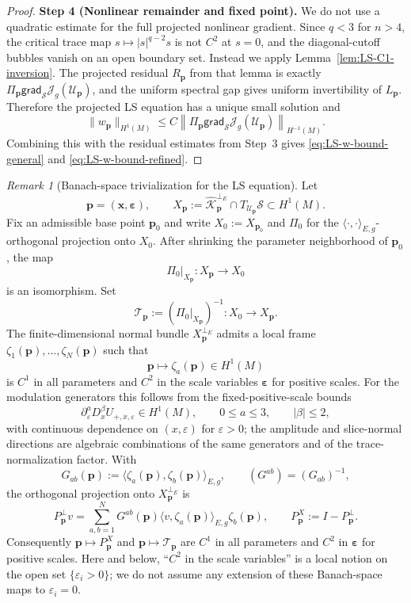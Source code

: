 \documentclass[11pt,reqno,a4paper]{amsart}
\numberwithin{equation}{section}
\theoremstyle{plain}
\theoremstyle{remark}
\newtheorem{remark}[theorem]{Remark}
\theoremstyle{plain}
\begin{document}
\begin{proof}
\medskip\noindent
\textbf{Step 4 (Nonlinear remainder and fixed point).}
We do not use a quadratic estimate for the full projected nonlinear gradient.
Since $q<3$ for $n>4$, the critical trace map $s\mapsto|s|^{q-2}s$ is not
$C^2$ at $s=0$, and the diagonal-cutoff bubbles vanish on an open boundary
set.  Instead we apply Lemma~\ref{lem:LS-C1-inversion}.  The projected
residual $R_{\mathbf p}$ from that lemma is exactly
$\Pi_{\mathbf p}\mathsf{grad}_{\mathcal S}\mathcal J_g(\mathcal U_{\mathbf p})$,
and the uniform spectral gap gives uniform invertibility of
$L_{\mathbf p}$.  Therefore the projected LS equation has a unique small
solution and
\[
\|w_{\mathbf p}\|_{H^1(M)}
\le
C
\left\|
\Pi_{\mathbf p}\mathsf{grad}_{\mathcal S}
\mathcal J_g(\mathcal U_{\mathbf p})
\right\|_{H^{-1}(M)}.
\]
Combining this with the residual estimates from Step~3 gives
\eqref{eq:LS-w-bound-general} and \eqref{eq:LS-w-bound-refined}.
\end{proof}

\begin{remark}[Banach-space trivialization for the LS equation]
\label{rem:banach-trivialization}
Let
\[
\mathbf p=(\mathbf x,\boldsymbol\varepsilon),\qquad
X_{\mathbf p}:=\widehat{\mathcal K}_{\mathbf p}^{\perp_E}
\cap T_{\mathcal U_{\mathbf p}}\mathcal S\subset H^1(M).
\]
Fix an admissible base point $\mathbf p_0$ and write $X_0:=X_{\mathbf p_0}$ and
$\Pi_0$ for the $\langle\cdot,\cdot\rangle_{E,g}$-orthogonal projection onto $X_0$.
After shrinking the parameter neighborhood of $\mathbf p_0$, the map
\[
\Pi_0|_{X_{\mathbf p}}:X_{\mathbf p}\longrightarrow X_0
\]
is an isomorphism.  Set
\[
\mathcal T_{\mathbf p}:=(\Pi_0|_{X_{\mathbf p}})^{-1}:X_0\longrightarrow X_{\mathbf p}.
\]
The finite-dimensional normal bundle $X_{\mathbf p}^{\perp_E}$ admits a local frame
$\zeta_1(\mathbf p),\dots,\zeta_N(\mathbf p)$ such that
\[
\mathbf p\longmapsto \zeta_a(\mathbf p)\in H^1(M)
\]
is $C^1$ in all parameters and $C^2$ in the scale variables $\boldsymbol\varepsilon$ for positive scales.  For
the modulation generators this follows from the fixed-positive-scale bounds
\[
\partial_{\varepsilon}^{a}D_x^\beta
U_{+,x,\varepsilon}\in H^1(M),
\qquad
0\le a\le3,
\qquad
|\beta|\le2,
\]
with continuous dependence on $(x,\varepsilon)$ for $\varepsilon>0$; the amplitude and slice-normal directions
are algebraic combinations of the same generators and of the trace-normalization factor.  With
\[
G_{ab}(\mathbf p):=\langle \zeta_a(\mathbf p),\zeta_b(\mathbf p)\rangle_{E,g},
\qquad (G^{ab})=(G_{ab})^{-1},
\]
the orthogonal projection onto $X_{\mathbf p}^{\perp_E}$ is
\[
P_{\mathbf p}^{\perp}v
=
\sum_{a,b=1}^N G^{ab}(\mathbf p)
\langle v,\zeta_a(\mathbf p)\rangle_{E,g}\zeta_b(\mathbf p),
\qquad
P_{\mathbf p}^{X}:=I-P_{\mathbf p}^{\perp}.
\]
Consequently $\mathbf p\mapsto P_{\mathbf p}^{X}$ and
$\mathbf p\mapsto\mathcal T_{\mathbf p}$ are $C^1$ in all parameters and $C^2$ in
$\boldsymbol\varepsilon$ for positive scales. Here and below, ``$C^2$ in the scale variables'' is a local notion on the open set $\{\varepsilon_i>0\}$; we do not assume any extension of these Banach-space maps to $\varepsilon_i=0$.
\end{remark}
\end{document}
